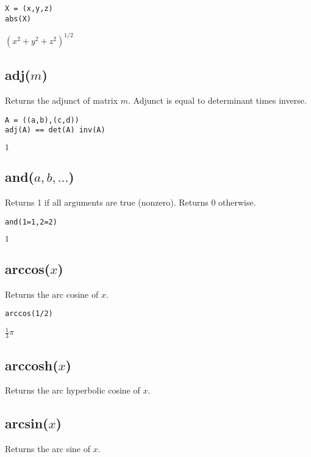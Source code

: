 \documentclass[12pt]{article}
\begin{document}
{\color{blue}
\begin{verbatim}
X = (x,y,z)
abs(X)
\end{verbatim}
}

\noindent
$\left(x^2+y^2+z^2\right)^{1/2}$

\subsection*{adj($m$)}

Returns the adjunct of matrix $m$.
Adjunct is equal to determinant times inverse.

{\color{blue}
\begin{verbatim}
A = ((a,b),(c,d))
adj(A) == det(A) inv(A)
\end{verbatim}
}

\noindent
$1$

\subsection*{and($a,b,\ldots$)}

Returns 1 if all arguments are true (nonzero).
Returns 0 otherwise.

{\color{blue}
\begin{verbatim}
and(1=1,2=2)
\end{verbatim}
}

\noindent
$1$

\subsection*{arccos($x$)}

Returns the arc cosine of $x$.

{\color{blue}
\begin{verbatim}
arccos(1/2)
\end{verbatim}
}

\noindent
$\tfrac{1}{3}\pi$

\subsection*{arccosh($x$)}

Returns the arc hyperbolic cosine of $x$.

\subsection*{arcsin($x$)}

Returns the arc sine of $x$.
\end{document}

